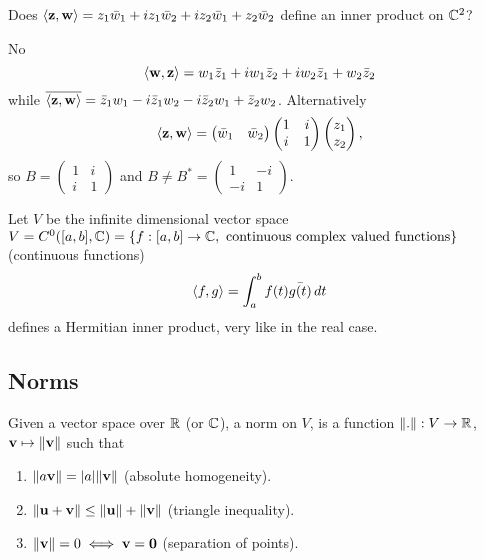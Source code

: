 \documentclass[10pt, a4paper]{article}
\begin{document}
\begin{example}
    Does $\langle\mathbf{z}, \mathbf{w}\rangle = z_1\Bar{w}_1 + iz_1\Bar{w}_2 + iz_2\Bar{w}_1 + z_2\Bar{w}_2$ define an inner product on $\mathbb{C} ^ 2$?

    \begin{solution}
        No
        \[
        \langle\mathbf{w}, \mathbf{z}\rangle = w_1\Bar{z}_1 + iw_1\Bar{z}_2 + iw_2\Bar{z}_1 + w_2\Bar{z}_2
        \]
        while $\overline{\langle\mathbf{z}, \mathbf{w}\rangle} = \Bar{z}_1w_1 - i\Bar{z}_1w_2 - i\Bar{z}_2w_1 + \Bar{z}_2w_2$.
        Alternatively
        \[
        \langle\mathbf{z}, \mathbf{w}\rangle =\begin{pmatrix}
            \Bar{w}_1 & \Bar{w}_2
        \end{pmatrix}\begin{pmatrix}
            1 & i \\ i & 1
        \end{pmatrix}\begin{pmatrix}
            z_1 \\ z_2
        \end{pmatrix},
        \]
        so $B = \begin{pmatrix}
            1 & i \\ i & 1
        \end{pmatrix}$ and $B \neq B ^ {*} = \begin{pmatrix}
            1 & -i \\ -i & 1
        \end{pmatrix}$.
    \end{solution}
\end{example}

\begin{example}
    Let $V$ be the infinite dimensional vector space $V = C ^ {0}([a, b], \mathbb{C}) = \{f : [a, b] \rightarrow \mathbb{C}, \text{ continuous complex valued functions}\}$
    (continuous functions)
    \[
    \langle f, g\rangle = \int_{a}^{b}f(t)\Bar{g(t)}\,dt
    \]
    defines a Hermitian inner product,
    very like in the real case.
\end{example}

\subsection{Norms}

\begin{definition}
    Given a vector space over $\mathbb{R}$
    (or $\mathbb{C}$),
    a norm on $V$,
    is a function $\| .\| : V \rightarrow \mathbb{R}$,
    $\mathbf{v} \mapsto \|\mathbf{v}\|$ such that
    \begin{enumerate}[label = (\roman*)]
        \item $\|a\mathbf{v}\| = |a|\|\mathbf{v}\|$
        (absolute homogeneity).

        \item $\|\mathbf{u} + \mathbf{v}\| \leq \|\mathbf{u}\| + \|\mathbf{v}\|$
        (triangle inequality).

        \item $\|\mathbf{v}\| = 0 \iff \mathbf{v} = \mathbf{0}$
        (separation of points).
    \end{enumerate}
\end{definition}
\end{document}
